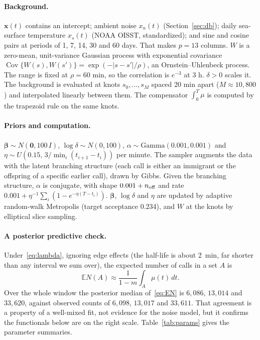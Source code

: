 \documentclass[11pt]{article}
\newcommand{\E}{\mathbb{E}}
\newcommand{\Cov}{\operatorname{Cov}}
\newcommand{\bx}{\bm{x}}
\newcommand{\bb}{\bm{\beta}}
\begin{document}
\paragraph{Background.}
$\bx(t)$ contains an intercept; ambient noise $x_n(t)$ (Section~\ref{sec:db});
daily sea-surface temperature $x_{s}(t)$ (NOAA OISST, standardized); and sine
and cosine pairs at periods of 1, 7, 14, 30 and 60 days. That makes
$p=13$ columns. $W$ is a zero-mean, unit-variance Gaussian process with
exponential covariance $\Cov\{W(s),W(s')\}=\exp(-|s-s'|/\rho)$, an
Ornstein--Uhlenbeck process. The range is fixed at $\rho=60$ min, so the
correlation is $e^{-3}$ at 3 h. $\delta>0$ scales it. The background is
evaluated at knots $s_0,\dots,s_M$ spaced 20 min apart
($M\approx10{,}800$) and interpolated linearly between them. The compensator
$\int_0^T\mu$ is computed by the trapezoid rule on the same knots.

\paragraph{Priors and computation.}
$\bb\sim N(\bm 0,100\,I)$, $\log\delta\sim N(0,100)$,
$\alpha\sim\mathrm{Gamma}(0.001,0.001)$ and
$\eta\sim U(0.15,\,3/\min_i(t_{i+1}-t_i))$ per minute. The sampler augments
the data with the latent branching structure (each call is either an
immigrant or the offspring of a specific earlier call), drawn by Gibbs. Given
the branching structure, $\alpha$ is conjugate, with shape $0.001+n_{\rm off}$
and rate $0.001+\eta^{-1}\sum_i(1-e^{-\eta(T-t_i)})$. $\bb$, $\log\delta$ and
$\eta$ are updated by adaptive random-walk Metropolis (target acceptance
0.234), and $W$ at the knots by elliptical slice sampling.

\paragraph{A posterior predictive check.}
Under~\eqref{eq:lambda}, ignoring edge effects (the half-life is about
2~min, far shorter than any interval we sum over), the expected number of
calls in a set $A$ is
\begin{equation}\label{eq:EN}
\E N(A)\approx\frac{1}{1-m}\int_A\mu(t)\,dt.
\end{equation}
Over the whole window the posterior median of~\eqref{eq:EN} is $6{,}086$,
$13{,}014$ and $33{,}620$, against observed counts of $6{,}098$, $13{,}017$
and $33{,}611$. That agreement is a property of a well-mixed fit, not
evidence for the noise model, but it confirms the functionals below are on
the right scale. Table~\ref{tab:params} gives the parameter summaries.
\end{document}
